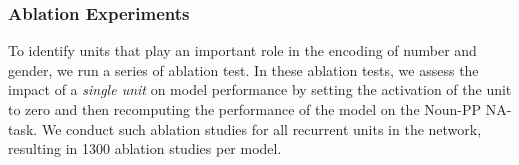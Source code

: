 \subsubsection{Ablation Experiments}
To identify units that play an important role in the encoding of number and gender, we run a series of ablation test.
In these ablation tests, we assess the impact of a \emph{single unit} on model performance by setting the activation of the unit to zero and then recomputing the performance of the model on the Noun-PP NA-task. 
We conduct such ablation studies for all recurrent units in the network, resulting in 1300 ablation studies per model.

